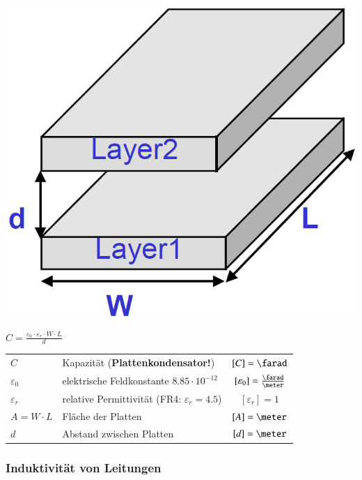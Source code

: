 \begin{minipage}[c]{0.28\columnwidth}
    \includegraphics[width=\columnwidth]{images/leitungen_kapazitaet.jpg}
\end{minipage}
\hfill
\begin{minipage}[c]{0.65\columnwidth}
    $ \boxed{C = \frac{\varepsilon_0 \cdot \varepsilon_r \cdot W \cdot L}{d}} $
\end{minipage}

\begin{tabular}{llc}
    $C$             & Kapazität (\textbf{Plattenkondensator!})          & $[C] = \farad$ \\
    $\varepsilon_0$ & elektrische Feldkonstante $8.85 \cdot 10^{-12}$   & $[\varepsilon_0] = \frac{\farad}{\meter}$ \\
    $\varepsilon_r$ & relative Permittivität (FR4: $\varepsilon_r= 4.5$)& $[\varepsilon_r] = 1$ \\
    $A = W \cdot L$ & Fläche der Platten                                & $[A] = \meter$ \\
    $d$             & Abstand zwischen Platten                          & $[d] = \meter$
\end{tabular}


\subsubsection{Induktivität von Leitungen}

